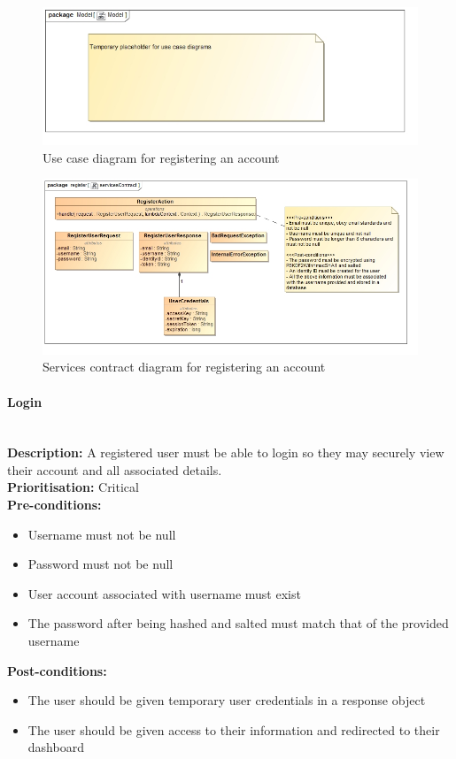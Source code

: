 \documentclass{article}
\begin{document}
		\begin{figure}[H]
			\includegraphics[width=\linewidth]{images/tempUseCase.jpg}
			\caption{Use case diagram for registering an account}
		\end{figure}		
		
		\begin{figure}[H]
			\includegraphics[width=\linewidth]{images/ServicesContracts/register.jpg}
			\caption{Services contract diagram for registering an account}
		\end{figure}
		
	\paragraph{Login}\mbox{}\\
		\textbf{Description:} A registered user must be able to login so they may securely view their account and all associated details.\\
		\textbf{Prioritisation:} Critical\\		
		\textbf{Pre-conditions:}
			\begin{itemize}
				\item Username must not be null
				\item Password must not be null
				\item User account associated with username must exist
				\item The password after being hashed and salted must match that of the provided username
			\end{itemize}
		\textbf{Post-conditions:}
			\begin{itemize}
				\item The user should be given temporary user credentials in a response object
				\item The user should be given access to their information and redirected to their dashboard
			\end{itemize}
\end{document}
